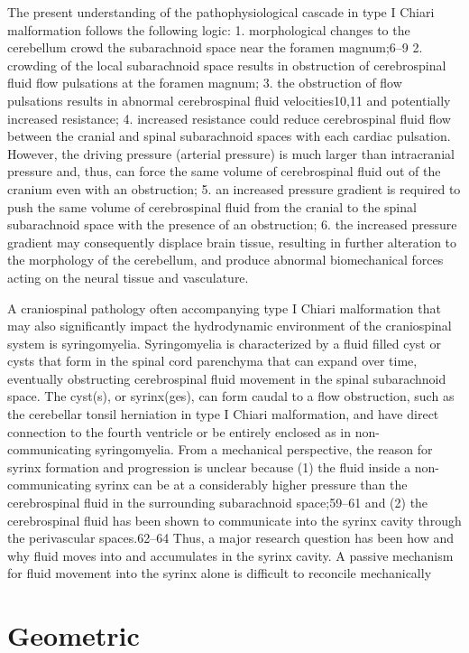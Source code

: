 \documentclass{report}
\begin{document}
The present understanding of
the pathophysiological cascade in type I Chiari
malformation follows the following logic:
1. morphological changes to the cerebellum crowd the
subarachnoid space near the foramen magnum;6–9
2. crowding of the local subarachnoid space results in
obstruction of cerebrospinal fluid flow pulsations
at the foramen magnum;
3. the obstruction of flow pulsations results in
abnormal cerebrospinal fluid velocities10,11 and
potentially increased resistance;
4. increased resistance could reduce cerebrospinal
fluid flow between the cranial and spinal subarachnoid
spaces with each cardiac pulsation.
However, the driving pressure (arterial pressure)
is much larger than intracranial pressure and, thus,
can force the same volume of cerebrospinal fluid
out of the cranium even with an obstruction;
5. an increased pressure gradient is required to push
the same volume of cerebrospinal fluid from the
cranial to the spinal subarachnoid space with the
presence of an obstruction;
6. the increased pressure gradient may consequently
displace brain tissue, resulting in further alteration
to the morphology of the cerebellum, and produce abnormal biomechanical forces acting on the
neural tissue and vasculature.

A craniospinal pathology often accompanying type I
Chiari malformation that may also significantly
impact the hydrodynamic environment of the craniospinal
system is syringomyelia. Syringomyelia is
characterized by a fluid filled cyst or cysts that form
in the spinal cord parenchyma that can expand over
time, eventually obstructing cerebrospinal fluid
movement in the spinal subarachnoid space. The
cyst(s), or syrinx(ges), can form caudal to a flow
obstruction, such as the cerebellar tonsil herniation in
type I Chiari malformation, and have direct connection
to the fourth ventricle or be entirely enclosed as
in non-communicating syringomyelia.
From a mechanical perspective, the reason for
syrinx formation and progression is unclear because
(1) the fluid inside a non-communicating syrinx can
be at a considerably higher pressure than the
cerebrospinal fluid in the surrounding subarachnoid
space;59–61 and (2) the cerebrospinal fluid has been
shown to communicate into the syrinx cavity through
the perivascular spaces.62–64 Thus, a major research
question has been how and why fluid moves into and
accumulates in the syrinx cavity. A passive mechanism
for fluid movement into the syrinx alone is
difficult to reconcile mechanically

\section{Geometric}
\end{document}
